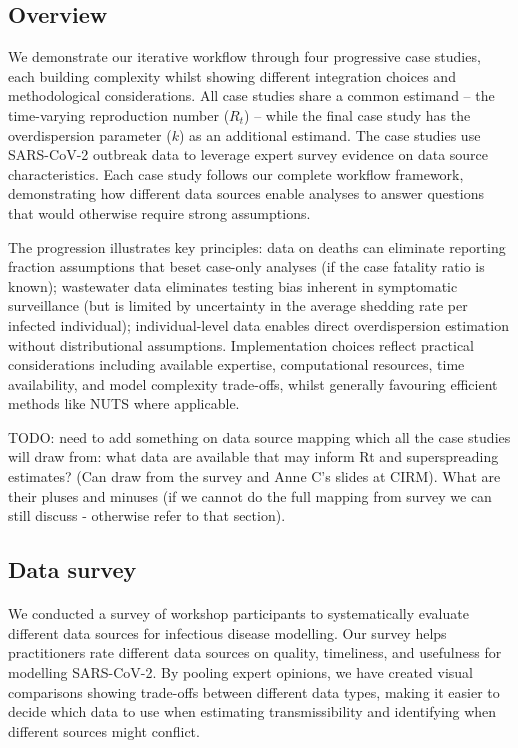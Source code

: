 \documentclass{article}
\begin{document}
\subsection{Overview}

We demonstrate our iterative workflow through four progressive case studies, each building complexity whilst showing different integration choices and methodological considerations.
All case studies share a common estimand -- the time-varying reproduction number ($R_t$) -- while the final case study has the overdispersion parameter ($k$) as an additional estimand. The case studies use SARS-CoV-2 outbreak data to leverage expert survey evidence on data source characteristics.
Each case study follows our complete workflow framework, demonstrating how different data sources enable analyses to answer questions that would otherwise require strong assumptions.

The progression illustrates key principles: data on deaths can eliminate reporting fraction assumptions that beset case-only analyses (if the case fatality ratio is known); wastewater data eliminates testing bias inherent in symptomatic surveillance (but is limited by uncertainty in the average shedding rate per infected individual); individual-level data enables direct overdispersion estimation without distributional assumptions.
Implementation choices reflect practical considerations including available expertise, computational resources, time availability, and model complexity trade-offs, whilst generally favouring efficient methods like NUTS where applicable.

TODO: need to add something on data source mapping which all the case studies will draw from: what data are available that may inform Rt and superspreading estimates? (Can draw from the survey and Anne C's slides at CIRM). What are their pluses and minuses (if we cannot do the full mapping from survey we can still discuss - otherwise refer to that section).

\subsection{Data survey}

\paragraph{}We conducted a survey of workshop participants to systematically evaluate different data sources for infectious disease modelling.
Our survey helps practitioners rate different data sources on quality, timeliness, and usefulness for modelling SARS-CoV-2. By pooling expert opinions, we have created visual comparisons showing trade-offs between different data types, making it easier to decide which data to use when estimating transmissibility and identifying when different sources might conflict.
\end{document}
